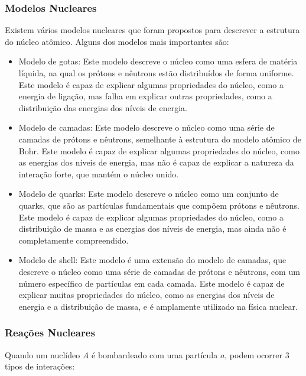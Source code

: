 \documentclass[11pt,a4paper]{article}
\begin{document}
\subsubsection*{Modelos Nucleares}
                
    Existem vários modelos nucleares que foram propostos para descrever a estrutura do núcleo atômico. Alguns dos modelos mais importantes são:

    \begin{itemize}

		\item Modelo de gotas: Este modelo descreve o núcleo como uma esfera de matéria líquida, na qual os prótons e nêutrons estão distribuídos de forma uniforme. Este modelo é capaz de explicar algumas propriedades do núcleo, como a energia de ligação, mas falha em explicar outras propriedades, como a distribuição das energias dos níveis de energia.
		
		\item Modelo de camadas: Este modelo descreve o núcleo como uma série de camadas de prótons e nêutrons, semelhante à estrutura do modelo atômico de Bohr. Este modelo é capaz de explicar algumas propriedades do núcleo, como as energias dos níveis de energia, mas não é capaz de explicar a natureza da interação forte, que mantém o núcleo unido.
		
		\item Modelo de quarks: Este modelo descreve o núcleo como um conjunto de quarks, que são as partículas fundamentais que compõem prótons e nêutrons. Este modelo é capaz de explicar algumas propriedades do núcleo, como a distribuição de massa e as energias dos níveis de energia, mas ainda não é completamente compreendido.
		
		\item Modelo de shell: Este modelo é uma extensão do modelo de camadas, que descreve o núcleo como uma série de camadas de prótons e nêutrons, com um número específico de partículas em cada camada. Este modelo é capaz de explicar muitas propriedades do núcleo, como as energias dos níveis de energia e a distribuição de massa, e é amplamente utilizado na física nuclear.
	\end{itemize}

\subsubsection*{Reações Nucleares}
                
    Quando um nuclídeo $A$ é bombardeado com uma partícula $a$, podem ocorrer 3 tipos de interações:
\end{document}
